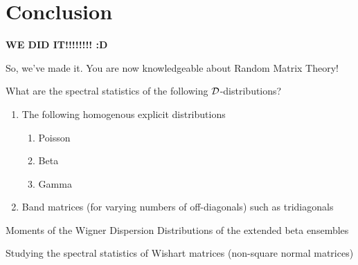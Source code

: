 
  \chapter*{Conclusion}

\textbf{WE DID IT!!!!!!!! :D} \newline
\medskip

So, we've made it. You are now knowledgeable about Random Matrix Theory!


\medskip
 What are the spectral statistics of the following $\mathcal{D}$-distributions?

\begin{enumerate}
  \item The following homogenous explicit distributions
    \begin{enumerate}
      \item Poisson
      \item Beta
      \item Gamma
    \end{enumerate}
  \item Band matrices (for varying numbers of off-diagonals) such as tridiagonals
\end{enumerate}

\medskip
 Moments of the Wigner Dispersion Distributions of the extended beta ensembles




\medskip
 Studying the spectral statistics of Wishart matrices (non-square normal matrices)
